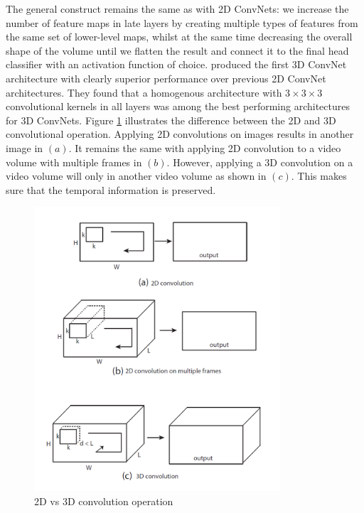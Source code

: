 \documentclass[extern,palatino]{cgMA}
\begin{document}
The general construct remains the same as with 2D ConvNets: we increase the number of feature maps in late layers by creating multiple types of features from the same set of lower-level maps, whilst at the same time decreasing the overall shape of the volume until we flatten the result and connect it to the final head classifier with an activation function of choice. \cite{tran2015learning} produced the first 3D ConvNet architecture with clearly superior performance over previous 2D ConvNet architectures. They found that a homogenous architecture with $3 \times 3 \times 3$ convolutional kernels in all layers was among the best performing architectures for 3D ConvNets. Figure \ref{2d_3d_convs} illustrates the difference between the 2D and 3D convolutional operation. Applying 2D convolutions on images results in another image in $(a)$. It remains the same with applying 2D convolution to a video volume with multiple frames in $(b)$. However, applying a 3D convolution on a video volume will only in another video volume as shown in $(c)$. This makes sure that the temporal information is preserved.

\begin{figure}[h]
\center
\includegraphics[height={300pt}, width={260pt}]{images/2d_3d_convs.png}
\caption{2D vs 3D convolution operation \cite{tran2015learning}}
\label{2d_3d_convs}
\end{figure}
\end{document}
